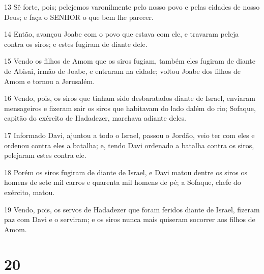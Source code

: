 \par 13 Sê forte, pois; pelejemos varonilmente pelo nosso povo e pelas cidades de nosso Deus; e faça o SENHOR o que bem lhe parecer.
\par 14 Então, avançou Joabe com o povo que estava com ele, e travaram peleja contra os siros; e estes fugiram de diante dele.
\par 15 Vendo os filhos de Amom que os siros fugiam, também eles fugiram de diante de Abisai, irmão de Joabe, e entraram na cidade; voltou Joabe dos filhos de Amom e tornou a Jerusalém.
\par 16 Vendo, pois, os siros que tinham sido desbaratados diante de Israel, enviaram mensageiros e fizeram sair os siros que habitavam do lado dalém do rio; Sofaque, capitão do exército de Hadadezer, marchava adiante deles.
\par 17 Informado Davi, ajuntou a todo o Israel, passou o Jordão, veio ter com eles e ordenou contra eles a batalha; e, tendo Davi ordenado a batalha contra os siros, pelejaram estes contra ele.
\par 18 Porém os siros fugiram de diante de Israel, e Davi matou dentre os siros os homens de sete mil carros e quarenta mil homens de pé; a Sofaque, chefe do exército, matou.
\par 19 Vendo, pois, os servos de Hadadezer que foram feridos diante de Israel, fizeram paz com Davi e o serviram; e os siros nunca mais quiseram socorrer aos filhos de Amom.

\chapter{20}

